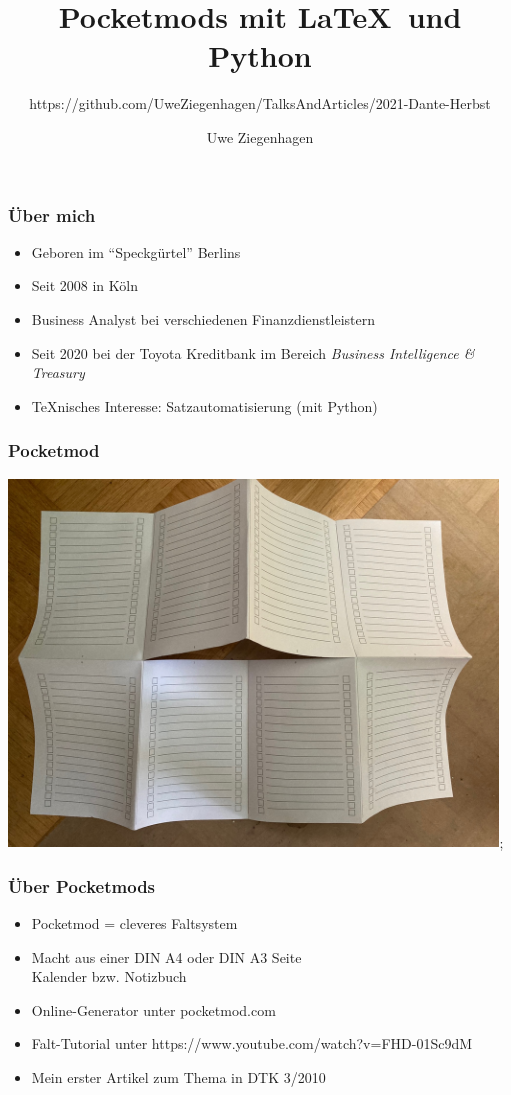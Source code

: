 \documentclass[12pt,ngerman]{beamer}
\author{Uwe Ziegenhagen}
\title{Pocketmods mit \LaTeX\ und Python}
\subtitle{https://github.com/UweZiegenhagen/TalksAndArticles/2021-Dante-Herbst}
\begin{document}
\begin{frame}

\maketitle

\end{frame}

\begin{frame}
\frametitle{Über mich}

\begin{itemize}
\item Geboren im \enquote{Speckgürtel} Berlins
\item Seit 2008 in Köln
\item Business Analyst bei verschiedenen Finanzdienstleistern
\item Seit 2020 bei der Toyota Kreditbank im Bereich \textit{Business Intelligence \& Treasury}
\item \TeX nisches Interesse: Satzautomatisierung (mit Python)
\end{itemize}
\end{frame}

\begin{frame}
\frametitle{Pocketmod}

\includegraphics[width=0.975\textwidth]{pmod.jpg};

\end{frame}



\begin{frame}
\frametitle{Über Pocketmods}

\begin{itemize}
\item Pocketmod = cleveres Faltsystem
\item Macht aus einer DIN A4 oder DIN A3 Seite \\  Kalender bzw. Notizbuch
\item Online-Generator unter pocketmod.com
\item Falt-Tutorial unter https://www.youtube.com/watch?v=FHD-01Sc9dM
\item Mein erster Artikel zum Thema in DTK 3/2010
\end{itemize}
\end{frame}
\end{document}
